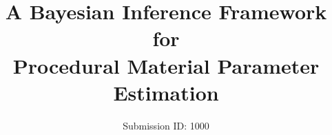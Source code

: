 \documentclass{egpubl}
\title[A Bayesian Inference Framework for Procedural Material Parameter Estimation]%
{A Bayesian Inference Framework for \\ Procedural Material Parameter Estimation\\[-0.5cm]}
\author[Submission ID: 1000]
{\parbox{\textwidth}{\centering Submission ID: 1000
	}
	\\
	{\parbox{\textwidth}{\centering
		}
	}
}
\begin{document}
 	
	\maketitle
	\begin{abstract}
		


	\end{abstract}
	
	
	
	
	
	
	
	
	

\end{document}
